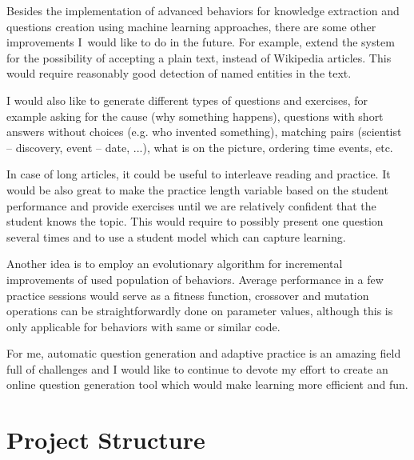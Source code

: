 \documentclass[12pt, twoside]{fithesis2}
\renewcommand{\_}{\leavevmode \kern0.07em\vbox{\hrule width0.4em}}
\newcounter{choice}
\begin{document}
Besides the implementation of advanced behaviors for knowledge extraction and questions creation using machine learning approaches, there are some other improvements I~would like to do in the future.
For example, extend the system for the possibility of accepting a plain text, instead of Wikipedia articles.
This would require reasonably good detection of named entities in the text.


I would also like to generate different types of questions and exercises,
for example
asking for the cause (why something happens),
questions with short answers without choices (e.g. who invented something),
matching pairs (scientist -- discovery,  event -- date, ...),
what is on the picture,
ordering time events, etc.

In case of long articles, it could be useful to interleave reading and practice.
It would be also great to make the practice length variable based on the student performance and provide exercises until we are relatively confident that the student knows the topic.
This would require to possibly present one question several times and to use a student model which can capture learning.

Another idea is to employ an evolutionary algorithm for incremental improvements of used population of behaviors.
Average performance in a few practice sessions would serve as a fitness function,
crossover and mutation operations can be straightforwardly done on parameter values,
although this is only applicable for behaviors with same or similar code.

For me, automatic question generation and adaptive practice is an amazing field full of challenges
and I would like to continue to devote my effort to create an online question generation tool which would make learning more efficient and fun.




\appendix


\printbibliography

\chapter{Project Structure}
\label{chap:project-structure}
\end{document}
